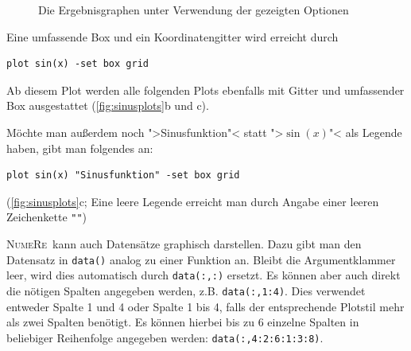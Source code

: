\documentclass[DIV=14,headsepline,footsepline]{scrbook}
\newcommand{\NR}{\textsc{Nu\-me\-Re}}
\begin{document}
\begin{figure}[p]
					\caption{Die Ergebnisgraphen unter Verwendung der gezeigten Optionen}
					\label{fig:sinusplots}
				\end{figure}
				
				Eine umfassende Box und ein Koordinatengitter wird erreicht durch
				\begin{lstlisting}
plot sin(x) -set box grid
				\end{lstlisting}
				Ab diesem Plot werden alle folgenden Plots ebenfalls mit Gitter und umfassender Box ausgestattet (\autoref{fig:sinusplots}b und c).
				
				Möchte man außerdem noch ">Sinusfunktion"< statt ">$\sin(x)$"< als Legende haben, gibt man folgendes an:
				\begin{lstlisting}
plot sin(x) "Sinusfunktion" -set box grid
				\end{lstlisting}
				(\autoref{fig:sinusplots}c; Eine leere Legende erreicht man durch Angabe einer leeren Zeichenkette \lstinline+""+)
				
				\NR\ kann auch Datensätze graphisch darstellen. Dazu gibt man den Datensatz in \lstinline+data()+ analog zu einer Funktion an. Bleibt die Argumentklammer leer, wird dies automatisch durch \lstinline+data(:,:)+ ersetzt. Es können aber auch direkt die nötigen Spalten angegeben werden, z.B. \lstinline+data(:,1:4)+. Dies verwendet entweder Spalte 1 und 4 oder Spalte 1 bis 4, falls der entsprechende Plotstil mehr als zwei Spalten benötigt. Es können hierbei bis zu 6 einzelne Spalten in beliebiger Reihenfolge angegeben werden: \lstinline+data(:,4:2:6:1:3:8)+.
				
\end{document}
